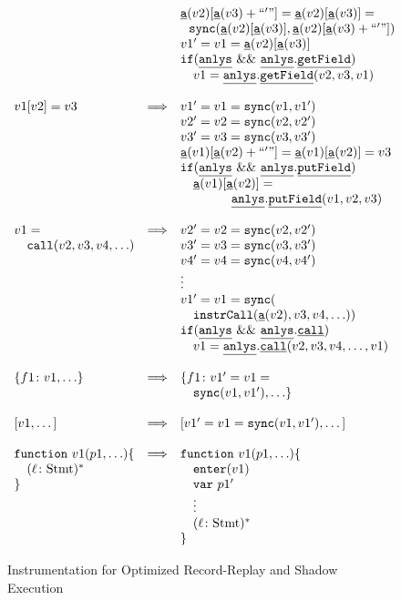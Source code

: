 \documentclass{sig-alternate}
\newcommand \dsl [1] {\ensuremath{{\tt #1}}\xspace}
\newcommand \usl [1] {\mbox{\underline{\tt #1}}\xspace}
\newcommand \Sync{\dsl{sync}}
\newcommand \Actual{\usl{a}}
\newcommand \Enter{\dsl{enter}}
\newcommand \analysis{\usl{anlys}}
\begin{document}
\begin{figure}
{\[\begin{array}{lrl}
& & \Actual(v2)[\Actual(v3)+``'"] = \Actual(v2)[\Actual(v3)] = \\
& & \ \ \Sync(\Actual(v2)[\Actual(v3)], \Actual(v2)[\Actual(v3)+``'"])\\
& & v1' = v1 = \Actual(v2)[\Actual(v3)]\\
& & \dsl{if} (\analysis \ \&\&\  \analysis.\usl{getField})\\
& & \quad v1 = \analysis.\usl{getField}(v2, v3, v1)\\
& & \\
    v1[v2] = v3 & \Longrightarrow & v1' = v1 = \Sync(v1, v1')\\
& & v2' = v2 = \Sync(v2, v2')\\
& & v3' = v3 = \Sync(v3, v3')\\
& & \Actual(v1)[\Actual(v2)+``'"] = \Actual(v1)[\Actual(v2)] = v3\\
& & \dsl{if} (\analysis \ \&\&\  \analysis.\usl{putField})\\
& & \quad \Actual(v1)[\Actual(v2)] = \\
& & \qquad\qquad \analysis.\usl{putField}(v1, v2, v3)\\
& & \\
    v1=& \Longrightarrow & v2' = v2 =
    \Sync(v2, v2')\\
\quad \dsl{call}(v2, v3, v4, \ldots) & & v3' = v3 = \Sync(v3, v3')\\
& & v4' = v4 = \Sync(v4, v4')\\
& & \vdots \\
& & v1' = v1 = \Sync(\\
& & \quad\dsl{instrCall}(\Actual(v2), v3, v4, \ldots))\\
& & \dsl{if} (\analysis \ \&\&\  \analysis.\usl{call})\\
& & \quad v1 = \analysis.\usl{call}(v2, v3, v4, \ldots, v1)\\
& & \\
  \{f1\colon v1, \ldots\} & \Longrightarrow &\{f1\colon v1' = v1 =\\
& &\quad  \Sync(v1, v1'), \ldots\} \\
& & \\
  \mbox{[}v1, \ldots\mbox{]} & \Longrightarrow & \mbox{[}v1' = v1 =
  \Sync(v1, v1'), \ldots\mbox{]} \\
& & \\
    \dsl{function}\ v1(p1, \ldots) \{ & \Longrightarrow &  \dsl{function}\ v1 (p1, \ldots) \{\\
\quad (\ell\colon \mbox{Stmt})^* & & \quad \Enter(v1)\\
\} & & \quad \dsl{var}\ p1'\\
& & \quad \vdots\\
& & \quad  (\ell\colon \mbox{Stmt})^*\\
& & \}\\
\end{array}
\]}
\caption{Instrumentation for Optimized Record-Replay and Shadow Execution}
\label{fig:instr3}
\end{figure}
\end{document}
